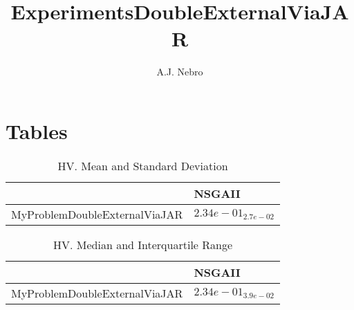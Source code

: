 \documentclass{article}
\title{ExperimentsDoubleExternalViaJAR}
\author{A.J. Nebro}
\begin{document}
\maketitle
\section{Tables}

\begin{table}
\caption{HV. Mean and Standard Deviation}
\label{table: HV}
\centering
\begin{scriptsize}
\begin{tabular}{ll}
\hline &  NSGAII\\
\hline 
MyProblemDoubleExternalViaJAR & \cellcolor{gray95}$  2.34e-01_{ 2.7e-02}$ \\
\hline
\end{tabular}
\end{scriptsize}
\end{table}

\begin{table}
\caption{HV. Median and Interquartile Range}
\label{table: HV}
\centering
\begin{scriptsize}
\begin{tabular}{ll}
\hline &  NSGAII\\
\hline 
MyProblemDoubleExternalViaJAR & \cellcolor{gray95}$  2.34e-01_{ 3.9e-02}$ \\
\hline
\end{tabular}
\end{scriptsize}
\end{table}
\end{document}
